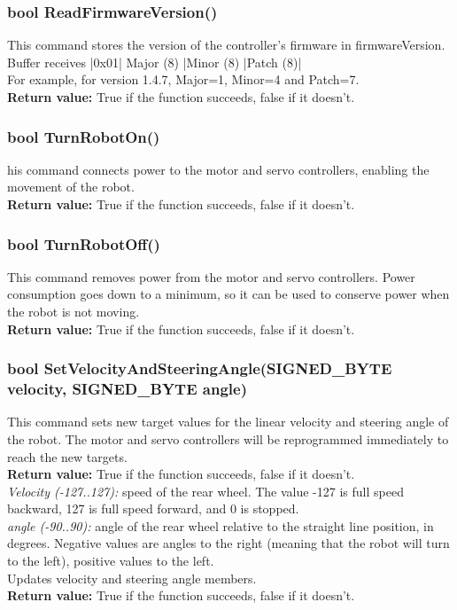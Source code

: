 \documentclass{book}
\begin{document}
\subsubsection{bool ReadFirmwareVersion()}
This command stores the version of the controller's firmware in firmwareVersion. Buffer receives |0x01| Major (8) |Minor (8) |Patch (8)|\\
For example, for version 1.4.7, Major=1, Minor=4 and Patch=7.\\
\textbf{Return value: }True if the function succeeds, false if it doesn't.\\ 

\subsubsection{bool TurnRobotOn()}
his command connects power to the motor and servo controllers, enabling the movement of the robot.\\
\textbf{Return value: }True if the function succeeds, false if it doesn't.\\ 

\subsubsection{bool TurnRobotOff()}
This command removes power from the motor and servo controllers. Power consumption goes down to a minimum, so it can be used to conserve power when the robot is not moving.\\
\textbf{Return value: }True if the function succeeds, false if it doesn't.\\ 

\subsubsection{bool SetVelocityAndSteeringAngle(SIGNED\_BYTE velocity, SIGNED\_BYTE angle)}
This command sets new target values for the linear velocity and steering angle of the robot. The motor and servo controllers will be reprogrammed immediately to reach the new targets. \\
\textbf{Return value: }True if the function succeeds, false if it doesn't.\\ 

\textit{Velocity (-127..127):} speed of the rear wheel. The value -127 is full speed backward, 127 is full speed forward, and 0 is stopped.\\
\textit{angle (-90..90):} angle of the rear wheel relative to the straight line position, in degrees. Negative values are angles to the right (meaning that the robot will turn to the left), positive values to the left.\\
Updates velocity and steering angle members.\\
\textbf{Return value: }True if the function succeeds, false if it doesn't.\\ 
\end{document}
